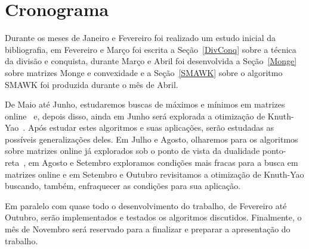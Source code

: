 \section{Cronograma}
Durante os meses de Janeiro e Fevereiro foi realizado um estudo inicial da bibliografia, em Fevereiro e Março foi escrita a Seção~\ref{DivConq} sobre a técnica da divisão e conquista, durante Março e Abril foi desenvolvida a Seção~\ref{Monge} sobre matrizes Monge e convexidade e a Seção~\ref{SMAWK} sobre o algoritmo SMAWK foi produzida durante o mês de Abril.  

De Maio até Junho, estudaremos buscas de máximos e mínimos em matrizes online~\cite{Galil:1992,Brucker:1995} e, depois disso, ainda em Junho será explorada a otimização de Knuth-Yao~\cite{Bein:2009,Knuth:1971,Yao:1980}. Após estudar estes algoritmos e suas aplicações, serão estudadas as possíveis generalizações deles. Em Julho e Agosto, olharemos para os algoritmos sobre matrizes online já explorados sob o ponto de vista da dualidade ponto-reta~\cite{Berg:2000}, em Agosto e Setembro exploramos condições mais fracas para a busca em matrizes online e em Setembro e Outubro revisitamos a otimização de Knuth-Yao buscando, também, enfraquecer as condições para sua aplicação. 

Em paralelo com quase todo o desenvolvimento do trabalho, de Fevereiro até Outubro, serão implementados e testados os algoritmos discutidos. Finalmente, o mês de Novembro será reservado para a finalizar e preparar a apresentação do trabalho.
